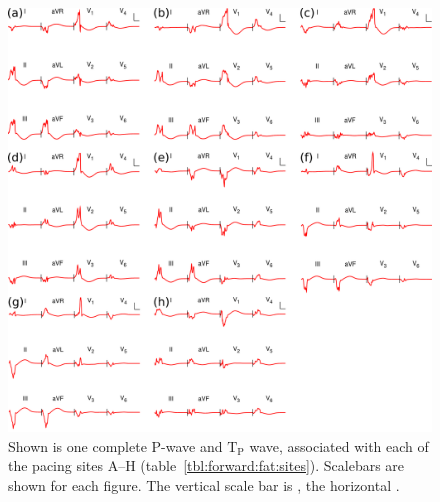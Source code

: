 \begin{figure}
\begin{center}
\includegraphics{figures/forward/kistler/ecgs}
\end{center}
\caption[P-wave ECGs For Ectopic Focal Sites]{
\label{fig:forward:fat:ecgs}
Shown is one complete P-wave and $\text{T}_{\text{P}}$ wave, associated with
each of the pacing sites A--H (table~\ref{tbl:forward:fat:sites}).
Scalebars are shown for each figure.
The vertical scale bar is , the horizontal .
}

\end{figure}

